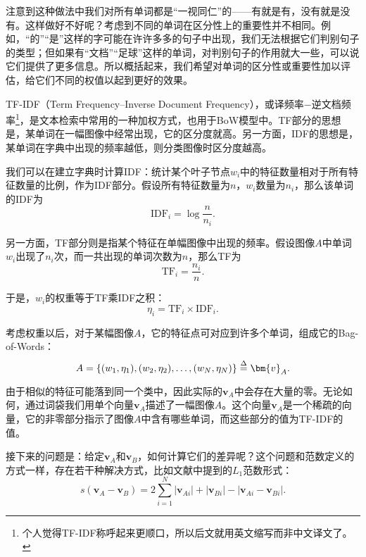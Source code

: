 注意到这种做法中我们对所有单词都是“一视同仁”的——有就是有，没有就是没有。这样做好不好呢？考虑到不同的单词在区分性上的重要性并不相同。例如，“的”“是”这样的字可能在许许多多的句子中出现，我们无法根据它们判别句子的类型；但如果有“文档”“足球”这样的单词，对判别句子的作用就大一些，可以说它们提供了更多信息。所以概括起来，我们希望对单词的区分性或重要性加以评估，给它们不同的权值以起到更好的效果。

TF-IDF（Term  Frequency–Inverse Document Frequency）\textsuperscript{\cite{Sivic2003, Robertson2004}}，或译频率−逆文档频率\footnote{个人觉得TF-IDF称呼起来更顺口，所以后文就用英文缩写而非中文译文了。}，是文本检索中常用的一种加权方式，也用于BoW模型中。TF部分的思想是，某单词在一幅图像中经常出现，它的区分度就高。另一方面，IDF的思想是，某单词在字典中出现的频率越低，则分类图像时区分度越高。

我们可以在建立字典时计算IDF：统计某个叶子节点$w_i$中的特征数量相对于所有特征数量的比例，作为IDF部分。假设所有特征数量为$n$，$w_i$数量为$n_i$，那么该单词的IDF为
\begin{equation}
\mathrm{IDF}_i = \log \frac{n}{n_i}.
\end{equation}

另一方面，TF部分则是指某个特征在单幅图像中出现的频率。假设图像$A$中单词$w_i$出现了$n_i$次，而一共出现的单词次数为$n$，那么TF为
\begin{equation}
\mathrm{TF}_i = \frac{n_i}{n}.
\end{equation}

于是，$w_i$的权重等于TF乘IDF之积：
\begin{equation}
\eta_i = \mathrm{TF}_i \times \mathrm{IDF}_i.
\end{equation}

考虑权重以后，对于某幅图像$A$，它的特征点可对应到许多个单词，组成它的Bag-of-Words：
\begin{equation}
A = \left\{ (w_1, \eta_1), (w_2, \eta_2), \ldots, (w_N, \eta_N)  \right\} \buildrel \Delta \over = \bm{v}_A.
\end{equation}

由于相似的特征可能落到同一个类中，因此实际的$\bm{v}_A$中会存在大量的零。无论如何，通过词袋我们用单个向量$\bm{v}_A$描述了一幅图像$A$。这个向量$\bm{v}_A$是一个稀疏的向量，它的非零部分指示了图像$A$中含有哪些单词，而这些部分的值为TF-IDF的值。

接下来的问题是：给定$\bm{v}_A$和$\bm{v}_B$，如何计算它们的差异呢？这个问题和范数定义的方式一样，存在若干种解决方式，比如文献\cite{Nister2006}中提到的$L_1$范数形式：
\begin{equation}
s\left( {{\bm{v}_A} - {\bm{v}_B}} \right) = 2\sum\limits_{i = 1}^N {\left| {{\bm{v}_{Ai}}} \right| + \left| {{\bm{v}_{Bi}}} \right| - \left| {{\bm{v}_{Ai}} - {\bm{v}_{Bi}}} \right|}.
\end{equation}

